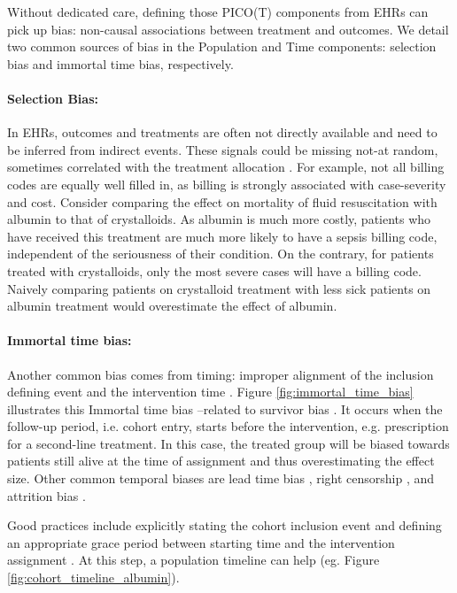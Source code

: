 \documentclass[french,12pt,twoside,a4paper]{book}
\begin{document}
Without dedicated care, defining those PICO(T) components from EHRs can
pick up bias: non-causal associations between treatment and outcomes.
We detail two common sources of bias in the
Population and Time components: selection bias and immortal time bias, respectively.

\paragraph{Selection Bias:} In EHRs, outcomes and treatments are often not
directly available and need to be inferred from indirect events. These signals
could be missing not-at random, sometimes correlated with the treatment
allocation \citep{weiskopf2023healthcare}. For example, not all billing
codes are equally well filled in, as billing is strongly associated with
case-severity and cost.
Consider comparing the effect on mortality of fluid resuscitation
with albumin to that of crystalloids. As albumin is much more costly,
patients who have received this treatment are much more likely to have
a sepsis billing code, independent of the seriousness of their
condition. On the contrary, for patients treated with crystalloids, only
the most severe cases will have a billing code. Naively comparing patients on crystalloid treatment with
less sick patients on albumin treatment would overestimate the effect of albumin.

\paragraph{Immortal time bias:} Another common bias comes from timing:
improper alignment of the inclusion defining event and the intervention time
\citep{suissa2008immortal,hernan2016specifying,wang2022understanding}. Figure
\ref{fig:immortal_time_bias} illustrates this
Immortal time bias --related to survivor bias \citep{lee2020immortaltimebias}.
It occurs when the follow-up period, i.e. cohort entry, starts before the
intervention, e.g. prescription for a
second-line treatment. In this case, the treated group will be
biased towards patients still alive at the time of assignment and thus
overestimating the effect size. Other common temporal biases are lead time bias
\citep{Oke2021leadtimebias,fu2021timing}, right censorship
\citep{hernan2016specifying}, and attrition bias
\citep{Bankhead2017attritionbias}.


Good practices include explicitly stating the cohort inclusion event
\citep[Chapter~10:Defining Cohorts]{ohdsi2019book} and defining an appropriate
grace period between starting time and the intervention assignment
\citep{hernan2016specifying}. At this step, a population timeline can help (eg.
Figure \ref{fig:cohort_timeline_albumin}).
\end{document}
